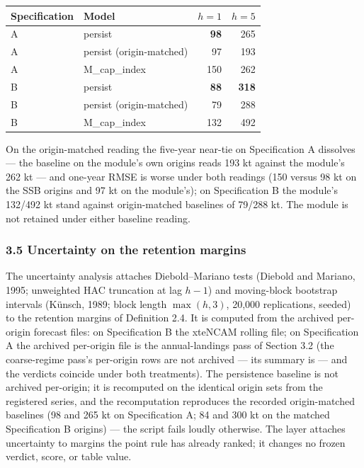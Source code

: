 \documentclass[11pt]{article}
\begin{document}
\begin{longtable}[]{@{}llrr@{}}
\toprule\noalign{}
Specification & Model & \(h=1\) & \(h=5\) \\
\midrule\noalign{}
\endhead
\bottomrule\noalign{}
\endlastfoot
A & persist & \textbf{98} & 265 \\
A & persist (origin-matched) & 97 & 193 \\
A & M\_cap\_index & 150 & 262 \\
B & persist & \textbf{88} & \textbf{318} \\
B & persist (origin-matched) & 79 & 288 \\
B & M\_cap\_index & 132 & 492 \\
\end{longtable}

On the origin-matched reading the five-year near-tie on Specification A
dissolves --- the baseline on the module's own origins reads 193 kt
against the module's 262 kt --- and one-year RMSE is worse under both
readings (150 versus 98 kt on the SSB origins and 97 kt on the
module's); on Specification B the module's 132/492 kt stand against
origin-matched baselines of 79/288 kt. The module is not retained under
either baseline reading.

\subsubsection{3.5 Uncertainty on the retention
margins}\label{uncertainty-on-the-retention-margins}

The uncertainty analysis attaches Diebold--Mariano tests (Diebold
and Mariano, 1995; unweighted HAC truncation at lag \(h-1\)) and
moving-block bootstrap intervals (K\"unsch, 1989; block length
\(\max(h,3)\), 20,000 replications, seeded) to the retention margins of
Definition 2.4. It is computed from the archived per-origin forecast
files: on Specification B the xteNCAM rolling file; on Specification A
the archived per-origin file is the annual-landings pass of Section 3.2
(the coarse-regime pass's per-origin rows are not archived --- its
summary is --- and the verdicts coincide under both treatments). The
persistence baseline is not archived per-origin; it is recomputed on the
identical origin sets from the registered series, and the recomputation
reproduces the recorded origin-matched baselines (98 and 265 kt on
Specification A; 84 and 300 kt on the matched Specification B origins)
--- the script fails loudly otherwise. The layer attaches uncertainty to
margins the point rule has already ranked; it changes no frozen verdict,
score, or table value.
\end{document}
